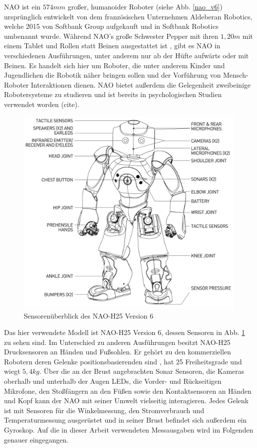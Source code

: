 NAO ist ein $574 \unit{mm}$ großer, humanoider Roboter (siehe Abb. \ref{nao_v6}) ursprünglich entwickelt von dem französischen Unternehmen Aldeberan Robotics, welche 2015 von Softbank Group aufgekauft \cite{aldebaran_to_softbank} und in Softbank Robotics umbenannt wurde. Während NAO's große Schwester Pepper mit ihren $1,20 \unit{m}$ mit einem Tablet und Rollen statt Beinen ausgestattet ist \cite{about_pepper}, gibt es NAO in verschiedenen Ausführungen, unter anderem nur ab der Hüfte aufwärts oder mit Beinen. Es handelt sich hier um Roboter, die unter anderem Kinder und Jugendlichen die Robotik näher bringen sollen und der Vorführung von Mensch-Roboter Interaktionen dienen. NAO bietet außerdem die Gelegenheit zweibeinige Robotersysteme zu studieren und ist bereits in psychologischen Studien verwendet worden (cite). 

\begin{figure}[hb]
	\centering
	\vspace{2cm}
	\includegraphics[width=0.7\linewidth]{Bilder/nao_h25_pres.png}
	\caption{Sensorenüberblick des NAO-H25 Version 6 \cite[in /H25]{nao_naoqi_docu}}
	\label{nao_v6_h25}
\end{figure}  

Das hier verwendete Modell ist NAO-H25 Version 6, dessen Sensoren in Abb. \ref{nao_v6_h25} zu sehen sind. Im Unterschied zu anderen Ausführungen besitzt NAO-H25 Drucksensoren an Händen und Fußsohlen. Er gehört zu den kommerziellen Robotern deren Gelenke positionsbasierenden sind \cite{balance_strategy}, hat 25 Freiheitsgrade und wiegt $5,4\unit{kg}$. Über die an der Brust angebrachten Sonar Sensoren, die Kameras oberhalb und unterhalb der Augen LEDs, die Vorder- und Rückseitigen Mikrofone, den Stoßfängern an den Füßen sowie den Kontaktsensoren an Händen und Kopf kann der NAO mit seiner Umwelt vielseitig interagieren. Jedes Gelenk ist mit Sensoren für die Winkelmessung, den Stromverbrauch und Temperaturmessung ausgerüstet und in seiner Brust befindet sich außerdem ein Gyroskop. Auf die in dieser Arbeit verwendeten Messausgaben wird im Folgenden genauer eingegangen.

